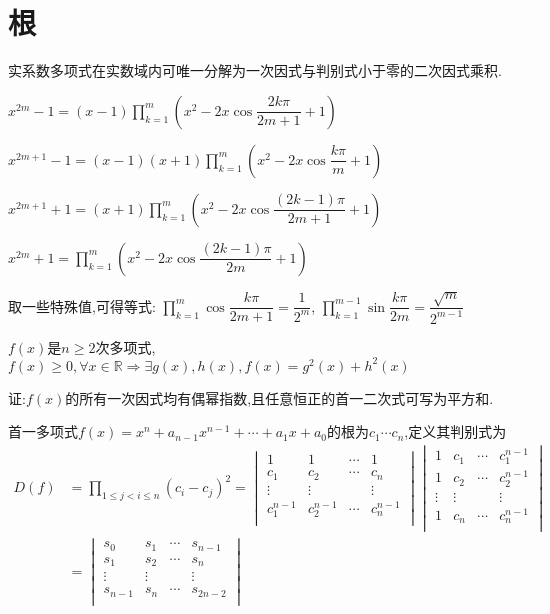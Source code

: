 \section{根}
实系数多项式在实数域内可唯一分解为一次因式与判别式小于零的二次因式乘积.

$ x^{2m}-1=(x-1) \prod_{k=1}^m{( x^2-2x\cos\dfrac{2k\pi}{2m+1}+1 )}$

$ x^{2m+1}-1 =(x-1)(x+1)\prod_{k=1}^m{(x^2-2x\cos\dfrac{k\pi}{m}+1)}$ 

$ x^{2m+1}+1=(x+1)\prod_{k=1}^m{( x^2-2x\cos\dfrac{(2k-1)\pi}{2m+1}+1 )}$

$ x^{2m}+1=\prod_{k=1}^m{(x^2-2x\cos\dfrac{(2k-1)\pi}{2m}+1)}$

取一些特殊值,可得等式:
$ \prod_{k=1}^m{\cos\dfrac{k\pi}{2m+1}}=\dfrac{1}{2^m}$,
$ \prod_{k=1}^{m-1}{\sin\dfrac{k\pi}{2m}}=\dfrac{\sqrt{m}}{2^{m-1}}$


$ f(x)$是$ n\ge2$次多项式,$ f(x)\ge 0,\forall x\in \mathbb{R}\Rightarrow \exists g(x),h(x),f(x)=g^2(x)+h^2(x)$

证:$ f(x)$的所有一次因式均有偶幂指数,且任意恒正的首一二次式可写为平方和.

首一多项式$ f(x)=x^n+a_{n-1}x^{n-1}+\cdots+a_1x+a_0$的根为$ c_1\cdots c_n$,定义其判别式为
\[ \begin{aligned}
	D(f) & =\prod_{1\le j< i\le n}{(c_i-c_j)^2}=
		\begin{vmatrix} 
		1 & 1 & \cdots & 1\\
		c_1 & c_2 & \cdots & c_n \\
		\vdots & \vdots & & \vdots \\
		c_1^{n-1} & c_2^{n-1} & \cdots & c_n^{n-1}\\
		\end{vmatrix}
		\begin{vmatrix}
		1 & c_1 & \cdots & c_1^{n-1}\\
		1 & c_2 & \cdots & c_2^{n-1}\\
		\vdots & \vdots & & \vdots \\
		1 & c_n & \cdots & c_n^{n-1}\\
		\end{vmatrix} \\
		& = \begin{vmatrix}
			s_0 & s_1 & \cdots & s_{n-1}\\
			s_1 & s_2 & \cdots & s_{n}\\
			\vdots & \vdots & & \vdots \\
			s_{n-1} & s_{n} & \cdots & s_{2n-2}\\
			\end{vmatrix}
\end{aligned} \]

